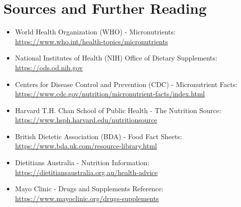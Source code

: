 \section*{Sources and Further Reading}
\begin{itemize}
    \item World Health Organization (WHO) - Micronutrients: \url{https://www.who.int/health-topics/micronutrients}
    \item National Institutes of Health (NIH) Office of Dietary Supplements: \url{https://ods.od.nih.gov}
    \item Centers for Disease Control and Prevention (CDC) - Micronutrient Facts: \url{https://www.cdc.gov/nutrition/micronutrient-facts/index.html}
    \item Harvard T.H. Chan School of Public Health - The Nutrition Source: \url{https://www.hsph.harvard.edu/nutritionsource}
    \item British Dietetic Association (BDA) - Food Fact Sheets: \url{https://www.bda.uk.com/resource-library.html}
    \item Dietitians Australia - Nutrition Information: \url{https://dietitiansaustralia.org.au/health-advice}
    \item Mayo Clinic - Drugs and Supplements Reference: \url{https://www.mayoclinic.org/drugs-supplements}
\end{itemize}